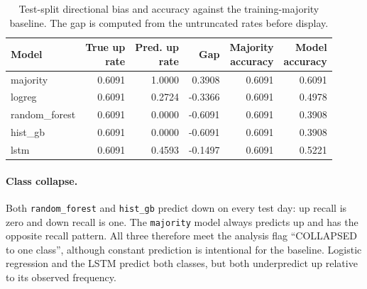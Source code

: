 \begin{table}[H]
    \centering
    \small
    \begin{tabular}{lrrrrr}
        \toprule
        Model & \shortstack{True up\\rate} & \shortstack{Pred. up\\rate} & Gap & \shortstack{Majority\\accuracy} & \shortstack{Model\\accuracy} \\
        \midrule
        majority       & 0.6091 & 1.0000 &  0.3908 & 0.6091 & 0.6091 \\
        logreg         & 0.6091 & 0.2724 & -0.3366 & 0.6091 & 0.4978 \\
        random\_forest & 0.6091 & 0.0000 & -0.6091 & 0.6091 & 0.3908 \\
        hist\_gb       & 0.6091 & 0.0000 & -0.6091 & 0.6091 & 0.3908 \\
        lstm           & 0.6091 & 0.4593 & -0.1497 & 0.6091 & 0.5221 \\
        \bottomrule
    \end{tabular}
    \caption{Test-split directional bias and accuracy against the training-majority baseline. The gap is computed from the untruncated rates before display.}
    \label{tab:b-bias-test}
\end{table}

\paragraph{Class collapse.}
Both \texttt{random\_forest} and \texttt{hist\_gb} predict down on every test day: up recall is zero and down recall is one. The \texttt{majority} model always predicts up and has the opposite recall pattern. All three therefore meet the analysis flag ``COLLAPSED to one class'', although constant prediction is intentional for the baseline. Logistic regression and the LSTM predict both classes, but both underpredict up relative to its observed frequency.

